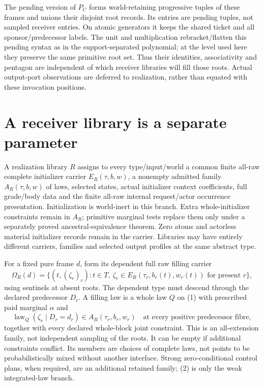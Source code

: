 \documentclass[11pt]{article}
\begin{document}
The pending version of $P_C$ forms world-retaining progressive tuples of these frames and unions their disjoint root records. Its entries are pending tuples, not sampled receiver entries. On atomic generators it keeps the shared ticket and all sponsor/predecessor labels. The unit and multiplication rebracket/flatten this pending syntax as in the support-separated polynomial; at the level used here they preserve the same primitive root set. Thus their identities, associativity and pentagon are independent of which receiver libraries will fill those roots. Actual output-port observations are deferred to realization, rather than equated with these invocation positions.

\section{A receiver library is a separate parameter}
A realization library $R$ assigns to every type/input/world a common finite all-raw complete initializer carrier $E_R(\tau,b,w)$, a nonempty admitted family $A_R(\tau,b,w)$ of laws, selected states, actual initializer context coefficients, full grade/body data and the finite all-raw internal request/actor occurrence presentation. Initialization is world-inert in this branch. Extra whole-initializer constraints remain in $A_R$; primitive marginal tests replace them only under a separately proved ancestral-equivalence theorem. Zero atoms and actorless material initializer records remain in the carrier. Libraries may have entirely different carriers, families and selected output profiles at the same abstract type.

For a fixed pure frame $d$, form its dependent full raw filling carrier
\[
 \Omega_R(d)=\{(t,(\zeta_r)_r): t\in T,
       \ \zeta_r\in E_R(\tau_r,b_r(t),w_r(t))
       \text{ for present }r\},                       \tag{1}
\]
using sentinels at absent roots. The dependent type must descend through the declared predecessor $D_r$. A filling law is a whole law $Q$ on (1) with prescribed paid marginal $\alpha$ and
\[
 \operatorname{law}_Q(\zeta_r\mid D_r=d_r)
       \in A_R(\tau_r,b_r,w_r)
       \quad\text{at every positive predecessor fibre}, \tag{2}
\]
together with every declared whole-block joint constraint. This is an all-extension family, not independent sampling of the roots. It can be empty if additional constraints conflict. Its members are choices of complete laws, not points to be probabilistically mixed without another interface. Strong zero-conditional control plans, when required, are an additional retained family; (2) is only the weak integrated-law branch.
\end{document}

